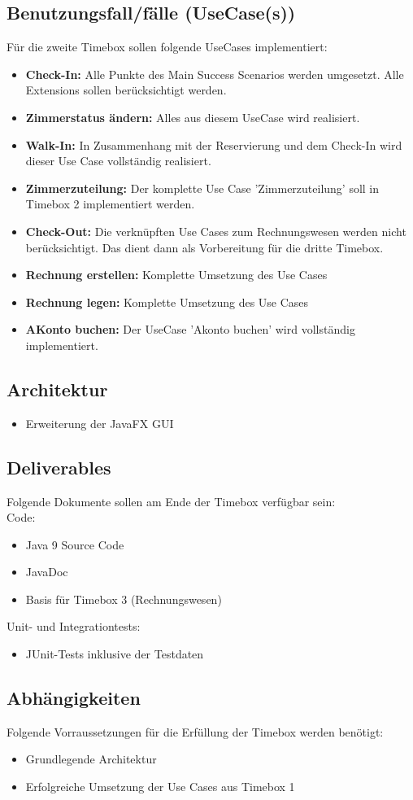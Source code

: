 \documentclass[../Pflichtenheft.tex]{subfiles}
\begin{document}
    \subsection{Benutzungsfall/fälle (UseCase(s)) }
    Für die zweite Timebox sollen folgende UseCases implementiert:
    \begin{itemize}
        \item \textbf{Check-In:} Alle Punkte des Main Success Scenarios werden umgesetzt.
        Alle Extensions sollen berücksichtigt werden.
        \item \textbf{Zimmerstatus ändern: } Alles aus diesem UseCase wird realisiert.
        \item \textbf{Walk-In: } In Zusammenhang mit der Reservierung und dem Check-In wird dieser Use Case vollständig realisiert.
        \item \textbf{Zimmerzuteilung: } Der komplette Use Case 'Zimmerzuteilung' soll in Timebox 2 implementiert werden.
        \item \textbf{Check-Out:} Die verknüpften Use Cases zum Rechnungswesen werden nicht berücksichtigt. Das dient dann als Vorbereitung für die dritte Timebox.
        \item \textbf{Rechnung erstellen:} Komplette Umsetzung des Use Cases
        \item \textbf{Rechnung legen:} Komplette Umsetzung des Use Cases
        \item \textbf{AKonto buchen: } Der UseCase 'Akonto buchen' wird vollständig implementiert.
    \end{itemize}
    \subsection{Architektur}
    \begin{itemize}
        \item Erweiterung der JavaFX GUI
    \end{itemize}
    \subsection{Deliverables}
    Folgende Dokumente sollen am Ende der Timebox verfügbar sein: \\
    Code:
    \begin{itemize}
        \item Java 9 Source Code
        \item JavaDoc
        \item Basis für Timebox 3 (Rechnungswesen)
    \end{itemize}
    Unit- und Integrationtests:
    \begin{itemize}
        \item JUnit-Tests inklusive der Testdaten
    \end{itemize}
    \subsection{Abhängigkeiten}
    Folgende Vorraussetzungen für die Erfüllung der Timebox werden benötigt:
    \begin{itemize}
        \item Grundlegende Architektur
        \item Erfolgreiche Umsetzung der Use Cases aus Timebox 1
    \end{itemize}
\end{document}
